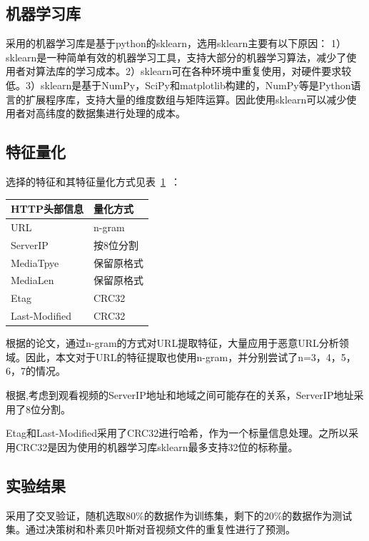 \subsection{机器学习库}
采用的机器学习库是基于python的sklearn，选用sklearn主要有以下原因：
1）sklearn是一种简单有效的机器学习工具，支持大部分的机器学习算法，减少了使用者对算法库的学习成本。2）sklearn可在各种环境中重复使用，对硬件要求较低。3）sklearn是基于NumPy，SciPy和matplotlib构建的，NumPy等是Python语言的扩展程序库，支持大量的维度数组与矩阵运算。因此使用sklearn可以减少使用者对高纬度的数据集进行处理的成本。

\subsection{特征量化}
选择的特征和其特征量化方式见表~\ref{tab:Selectedfeatures}~：
\begin{table}[!htbp]
    \label{tab:Selectedfeatures}
    \centering
    \footnotesize%
    \setlength{\tabcolsep}{4pt}%
    \renewcommand{\arraystretch}{1.2}%
    \begin{tabular}{ll}
        \hline
        HTTP头部信息&量化方式\\
        \hline
        URL&n-gram\\
        ServerIP&按8位分割\\
        MediaTpye&保留原格式\\
        MediaLen&保留原格式\\
        Etag&CRC32\\
        Last-Modified&CRC32\\
        \hline
    \end{tabular}
\end{table}

根据\cite{Sahoo2017Malicious}的论文，通过n-gram的方式对URL提取特征，大量应用于恶意URL分析领域。因此，本文对于URL的特征提取也使用n-gram，并分别尝试了n=3，4，5，6，7的情况。

根据\cite{Tan2018},考虑到观看视频的ServerIP地址和地域之间可能存在的关系，ServerIP地址采用了8位分割。

Etag和Last-Modified采用了CRC32进行哈希，作为一个标量信息处理。之所以采用CRC32是因为使用的机器学习库sklearn最多支持32位的标称量。

\subsection{实验结果}
采用了交叉验证，随机选取80\%的数据作为训练集，剩下的20\%的数据作为测试集。通过决策树和朴素贝叶斯对音视频文件的重复性进行了预测。

